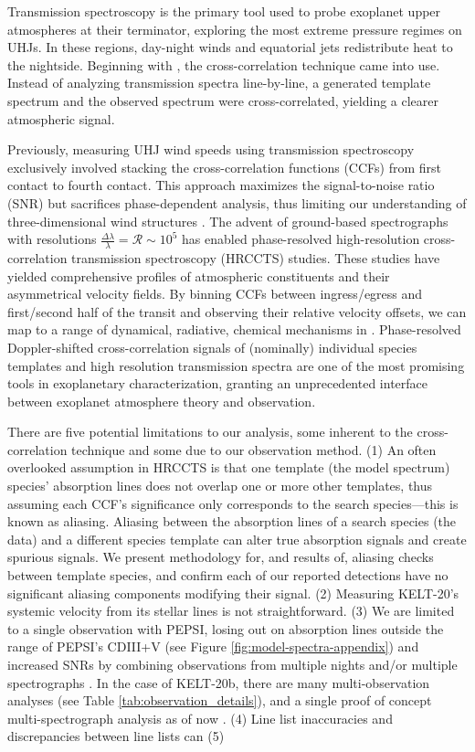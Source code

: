 \documentclass[twocolumn]{aastex631}
\begin{document}
        Transmission spectroscopy is the primary tool used to probe exoplanet upper atmospheres at their terminator, exploring the most extreme pressure regimes on UHJs. In these regions, day-night winds and equatorial jets redistribute heat to the nightside. Beginning with \citet{Snellen2010}, the cross-correlation technique came into use. Instead of analyzing transmission spectra line-by-line, a generated template spectrum and the observed spectrum were cross-correlated, yielding a clearer atmospheric signal.  
        
        Previously, measuring UHJ wind speeds using transmission spectroscopy exclusively involved stacking the cross-correlation functions (CCFs) from first contact to fourth contact. This approach maximizes the signal-to-noise ratio (SNR) but sacrifices phase-dependent analysis, thus limiting our understanding of three-dimensional wind structures \citep{MillerRicciKempton2012}. The advent of ground-based spectrographs with resolutions $\frac{\Delta\lambda}{\lambda} = \mathcal{R}\sim10^{5}$  has enabled phase-resolved high-resolution cross-correlation transmission spectroscopy (HRCCTS) studies. These studies have yielded comprehensive profiles of atmospheric constituents and their asymmetrical velocity fields. By binning CCFs between ingress/egress and first/second half of the transit and observing their relative velocity offsets, we can map to a range of dynamical, radiative, chemical mechanisms in \citet{Savel2023}. Phase-resolved Doppler-shifted cross-correlation signals of (nominally) individual species templates and high resolution transmission spectra are one of the most promising tools in exoplanetary characterization, granting an unprecedented interface between exoplanet atmosphere theory and observation.

        There are five potential limitations to our analysis, some inherent to the cross-correlation technique and some due to our observation method. (1) An often overlooked assumption in HRCCTS is that one template (the model spectrum) species' absorption lines does not overlap one or more other templates, thus assuming each CCF's significance only corresponds to the search species---this is known as aliasing. Aliasing between the absorption lines of a search species (the data) and a different species template can alter true absorption signals and create spurious signals. We present methodology for, and results of, aliasing checks between template species, and confirm each of our reported detections have no significant aliasing components modifying their signal. (2) Measuring KELT-20's systemic velocity from its stellar lines is not straightforward. \citep{Pino2022} (3) We are limited to a single observation with PEPSI, losing out on absorption lines outside the range of PEPSI's CDIII+V (see Figure \ref{fig:model-spectra-appendix}) and increased SNRs by combining observations from multiple nights and/or multiple spectrographs \citep{Brogi2017}. In the case of KELT-20b, there are many multi-observation analyses (see Table \ref{tab:observation_details}), and a single proof of concept multi-spectrograph analysis as of now \citep{PaiAsnodkar2022}. (4) Line list inaccuracies and discrepancies between line lists can  (5)
\end{document}
